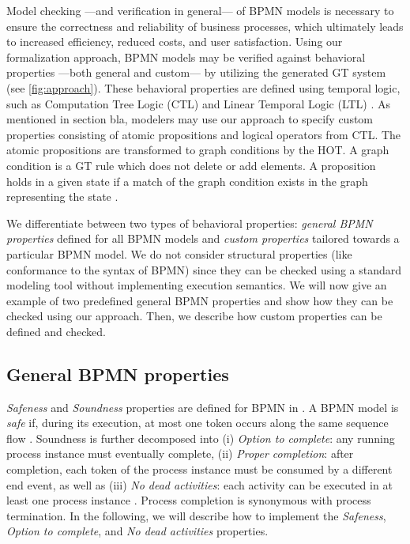 \documentclass{lmcs} %
\begin{document}
Model checking ---and verification in general--- of BPMN models is necessary to ensure the correctness and reliability of business processes, which ultimately leads to increased efficiency, reduced costs, and user satisfaction.
Using our formalization approach, BPMN models may be verified against behavioral properties ---both general and custom--- by utilizing the generated GT system (see \autoref{fig:approach}).
These behavioral properties are defined using temporal logic, such as Computation Tree Logic (CTL) and Linear Temporal Logic (LTL) \cite{baierPrinciplesModelChecking2008}.
As mentioned in section bla, modelers may use our approach to specify custom properties consisting of atomic propositions and logical operators from CTL.
The atomic propositions are transformed to graph conditions by the HOT.
A graph condition is a GT rule which does not delete or add elements.
A proposition holds in a given state if a match of the graph condition exists in the graph representing the state \cite{kastenbergModelCheckingDynamic2006}.

We differentiate between two types of behavioral properties: \textit{general BPMN properties} defined for all BPMN models and \textit{custom properties} tailored towards a particular BPMN model.
We do not consider structural properties (like conformance to the syntax of BPMN) since they can be checked using a standard modeling tool without implementing execution semantics.
We will now give an example of two predefined general BPMN properties and show how they can be checked using our approach.
Then, we describe how custom properties can be defined and checked.

\subsection{General BPMN properties}
\textit{Safeness} and \textit{Soundness} properties are defined for BPMN in \cite{corradiniClassificationBPMNCollaborations2018}.
A BPMN model is \textit{safe} if, during its execution, at most one token occurs along the same sequence flow \cite{corradiniClassificationBPMNCollaborations2018}.
Soundness is further decomposed into (i) \textit{Option to complete}: any running process instance must eventually complete, (ii) \textit{Proper completion}: after completion, each token of the process instance must be consumed by a different end event, as well as (iii) \textit{No dead activities}: each activity can be executed in at least one process instance \cite{corradiniClassificationBPMNCollaborations2018}.
Process completion is synonymous with process termination.
In the following, we will describe how to implement the \textit{Safeness}, \textit{Option to complete}, and \textit{No dead activities} properties.
\end{document}
